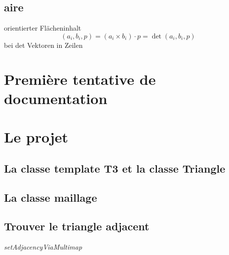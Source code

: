 \documentclass[10pt]{article}
\begin{document}
\subsection{aire}

orientierter Flächeninhalt
$$ (a_i,b_i,p) = (a_i \times b_i ) \cdot p = \det(a_i,b_i,p) $$
bei det Vektoren in Zeilen


\newpage

\section{Première tentative de documentation}

\section{Le projet}

\subsection{La classe template T3 et la classe Triangle}

\subsection{La classe maillage}





\subsection{Trouver le triangle adjacent}


\centering
 {\large \itshape{setAdjacencyViaMultimap} } 
  
\raggedright
\end{document}
